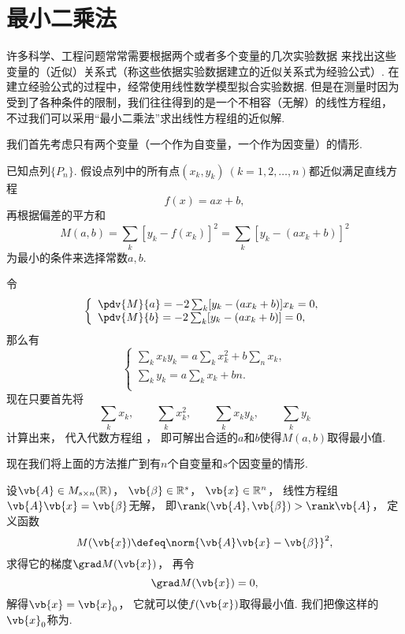 \section{最小二乘法}
许多科学、工程问题常常需要根据两个或者多个变量的几次实验数据
来找出这些变量的（近似）关系式（称这些依据实验数据建立的近似关系式为经验公式）.
在建立经验公式的过程中，经常使用线性数学模型拟合实验数据.
但是在测量时因为受到了各种条件的限制，我们往往得到的是一个不相容（无解）的线性方程组，
不过我们可以采用“最小二乘法”求出线性方程组的近似解.

我们首先考虑只有两个变量（一个作为自变量，一个作为因变量）的情形.

已知点列\(\{P_n\}\).
假设点列中的所有点\((x_k,y_k)\ (k=1,2,\dotsc,n)\)都近似满足直线方程\begin{equation*}
	f(x) = a x + b,
\end{equation*}
再根据偏差的平方和\begin{equation*}
	M(a,b) = \sum_k [y_k - f(x_k)]^2 = \sum_k [y_k - (a x_k + b)]^2
\end{equation*}为最小的条件来选择常数\(a,b\).

令\begin{equation*}
	\left\{ \begin{array}{l}
		\pdv{M}{a} = -2 \sum_k [y_k - (a x_k + b)] x_k = 0, \\
		\pdv{M}{b} = -2 \sum_k [y_k - (a x_k + b)] = 0,
	\end{array} \right.
\end{equation*}
那么有\begin{equation}\label{equation:最小二乘法.关于a和b的代数方程组}
	\left\{ \begin{array}{l}
		\sum_k x_k y_k = a \sum_k x_k^2 + b \sum_n x_k, \\
		\sum_k y_k = a \sum_k x_k + b n. \\
	\end{array} \right.
\end{equation}
现在只要首先将\begin{equation*}
	\sum_k x_k, \qquad
	\sum_k x_k^2, \qquad
	\sum_k x_k y_k, \qquad
	\sum_k y_k
\end{equation*}计算出来，
代入代数方程组 ，
即可解出合适的\(a\)和\(b\)使得\(M(a,b)\)取得最小值.

现在我们将上面的方法推广到有\(n\)个自变量和\(s\)个因变量的情形.

设\(\vb{A} \in M_{s \times n}(\mathbb{R})\)，
\(\vb{\beta} \in \mathbb{R}^s\)，
\(\vb{x} \in \mathbb{R}^n\)，
线性方程组\(\vb{A}\vb{x}=\vb{\beta}\)无解，
即\(\rank(\vb{A},\vb{\beta})>\rank\vb{A}\)，
定义函数\begin{equation*}
	M(\vb{x})
	\defeq
	\norm{\vb{A}\vb{x}-\vb{\beta}}^2,
\end{equation*}
求得它的梯度\(\grad M(\vb{x})\)，
再令\begin{equation*}
	\grad M(\vb{x}) = 0,
\end{equation*}
解得\(\vb{x}=\vb{x}_0\)，
它就可以使\(f(\vb{x})\)取得最小值.
我们把像这样的\(\vb{x}_0\)称为.

\endgroup

